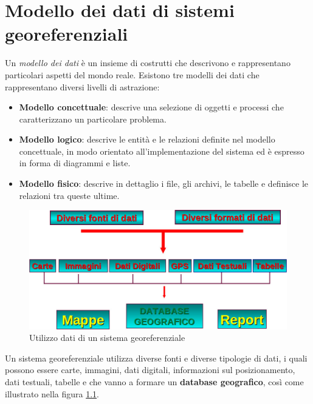 
\chapter{Modello dei dati di sistemi georeferenziali}
\label{modellodati}

Un \textit{modello dei dati} è un insieme di costrutti che descrivono e rappresentano particolari aspetti del mondo reale.
Esistono tre modelli dei dati che rappresentano diversi livelli di astrazione:
\begin{itemize}
\item \textbf{Modello concettuale}: descrive una selezione di oggetti e processi che caratterizzano un particolare problema.
\item \textbf{Modello logico}: descrive le entità e le relazioni definite nel modello concettuale, in modo orientato all'implementazione del sistema ed è espresso in forma di diagrammi e liste.
\item \textbf{Modello fisico}: descrive in dettaglio i file, gli archivi, le tabelle e definisce le relazioni tra queste ultime.
\end{itemize}

\begin{figure}
\includegraphics[scale=0.4]{./imgs/datigeograficiimage.jpg}
\caption{Utilizzo dati di un sistema georeferenziale\label{ref:datigeograficiimage}}

\end{figure}



Un sistema georeferenziale utilizza diverse fonti e diverse tipologie di dati, i quali possono essere carte, immagini, dati digitali, informazioni sul posizionamento, dati testuali, tabelle e che vanno a formare un \textbf{database geografico}, così come illustrato nella figura \ref{ref:datigeograficiimage}.

